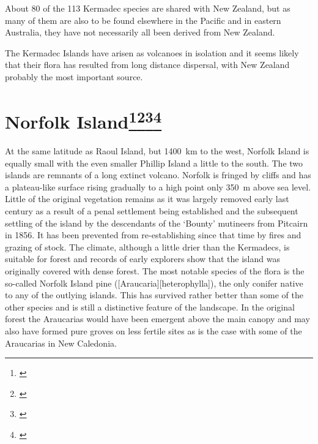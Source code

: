 About 80 of the 113 Kermadec species are shared with New Zealand, but as many of them are also to be found elsewhere in the Pacific and in eastern Australia, they have not necessarily all been derived from New Zealand.

The Kermadec Islands have arisen as volcanoes in isolation and it seems likely that their flora has resulted from long distance dispersal, with New Zealand probably the most important source.

\section[Norfolk Island]{Norfolk Island\thinspace\footnote{\cite{laing1915revised}}\footnote{\cite{turner1968conservation}}\footnote{\cite{green1970notes}}\footnote{\cite{green1979observations}}}

At the same latitude as Raoul Island, but \SI{1400}{\kilo\metre} to the west, Norfolk Island is equally small with the even smaller Phillip Island a little to the south.
The two islands are remnants of a long extinct volcano.
Norfolk is fringed by cliffs and has a plateau-like surface rising gradually to a high point only \SI{350}{\metre} above sea level.
Little of the original vegetation remains as it was largely removed early last century as a result of a penal settlement being established and the subsequent settling of the island by the descendants of the `Bounty' mutineers from Pitcairn in 1856.
It has been prevented from re-establishing since that time by fires and grazing of stock.
The climate, although a little drier than the Kermadecs, is suitable for forest and records of early explorers show that the island was originally covered with dense forest.
The most notable species of the flora is the so-called Norfolk Island pine ([Araucaria][heterophylla]), the only conifer native to any of the outlying islands.
This has survived rather better than some of the other species and is still a distinctive feature of the landscape.
In the original forest the Araucarias would have been emergent above the main canopy and may also have formed pure groves on less fertile sites as is the case with some of the Araucarias in New Caledonia.

